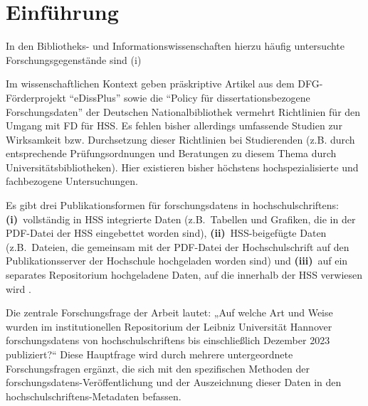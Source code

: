 \chapter{Einführung}\label{ch:einfuehrung}


In den Bibliotheks- und Informationswissenschaften hierzu häufig untersuchte Forschungsgegenstände sind (i)~

Im wissenschaftlichen Kontext geben präskriptive Artikel aus dem DFG-Förderprojekt \enquote{eDissPlus} \autocite{Weisbrod2017eDissPlus, KleinebergKaden2018, Weisbrod2018} sowie die \enquote{Policy für dissertationsbezogene Forschungsdaten} der Deutschen Nationalbibliothek \autocite{dnb2017} vermehrt Richtlinien für den Umgang mit FD für HSS. Es fehlen bisher allerdings umfassende Studien zur Wirksamkeit bzw. Durchsetzung dieser Richtlinien bei Studierenden (z.B. durch entsprechende Prüfungsordnungen und Beratungen zu diesem Thema durch Universitätsbibliotheken). Hier existieren bisher höchstens hochspezialisierte und fachbezogene Untersuchungen.


Es gibt drei Publikationsformen für \glspl{forschungsdaten} in \glspl{hochschulschriften}: \textbf{(i)}~vollständig in HSS integrierte Daten (z.B.~Tabellen und Grafiken, die in der PDF-Datei der HSS eingebettet worden sind), \textbf{(ii)}~HSS-beigefügte Daten (z.B.~Dateien, die gemeinsam mit der PDF-Datei der Hochschulschrift auf den Publikationsserver der Hochschule hochgeladen worden sind)  und \textbf{(iii)}~auf ein separates Repositorium hochgeladene Daten, auf die innerhalb der HSS verwiesen wird \autocites[S.~5f.]{ReillyEtAl2011}.

Die zentrale Forschungsfrage der Arbeit lautet: „Auf welche Art und Weise wurden im institutionellen Repositorium der Leibniz Universität Hannover \glspl{forschungsdaten} von \glspl{hochschulschriften} bis einschließlich Dezember 2023 publiziert?“ Diese Hauptfrage wird durch mehrere untergeordnete Forschungsfragen ergänzt, die sich mit den spezifischen Methoden der \glspl{forschungsdaten}-Veröffentlichung und der Auszeichnung dieser Daten in den \glspl{hochschulschriften}-Metadaten befassen.

